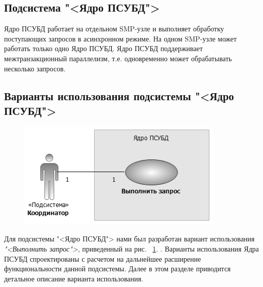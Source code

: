 \documentclass[11pt,oneside]{article}
\begin{document}
	\subsection{Подсистема "<Ядро ПСУБД">}\label{S_Kernel}
	Ядро ПСУБД работает на отдельном SMP-узле и выполняет обработку поступающих запросов в асинхронном режиме. На одном SMP-узле может работать только одно Ядро ПСУБД. Ядро ПСУБД поддерживает межтранзакционный параллелизм, т.е. одновременно может обрабатывать несколько запросов.
	
	\subsection{Варианты использования подсистемы "<Ядро ПСУБД">}\label{S_KernelUseCases}
	
	\begin{figure}[h]
		\centering
		\includegraphics[width=0.7\linewidth]{kernelUCDiagram}
		\caption{}
		\label{fig:kernelucdiagram}
	\end{figure}
	
	
	Для подсистемы "<Ядро ПСУБД"> нами был разработан вариант использования \textit{"<Выполнить запрос">}, приведенный на рис. ~\ref{fig:kernelucdiagram}.
	. Варианты использования Ядра ПСУБД спроектированы с расчетом на дальнейшее расширение функциональности данной подсистемы. Далее в этом разделе приводится детальное описание варианта использования.
	
\end{document}
